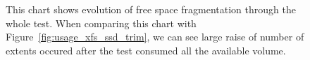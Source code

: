 \documentclass[
  color, %
  table, %
  lof,   %
  lot,   %
]{fithesis3}
\begin{document}
\begin{figure}[h]
    \centering
    \caption[Evolution of free space fragmentation of XFS during testing on SSD with regular trimming]{This chart shows evolution of free space fragmentation through the whole test. When comparing this chart with Figure~\ref{fig:usage_xfs_ssd_trim}, we can see large raise of number of extents occured after the test consumed all the available volume.}
    \label{fig:free_xfs_ssd_trim}
\end{figure}
\end{document}
